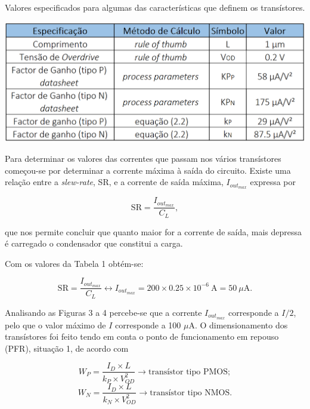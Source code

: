 \documentclass[11pt]{article}
\numberwithin{equation}{section}
\begin{document}
\begin{table}[H]
	\centering
	\caption{Valores especificados para algumas das características que definem os transístores.}
	\vspace{-1.5mm}
	\includegraphics[keepaspectratio=true, scale=0.45]{teoricas/tabela2}
\end{table}

Para determinar os valores das correntes que passam nos vários transístores começou-se por determinar a corrente máxima à saída do circuito. Existe uma relação entre a \textit{slew-rate}, SR, e a corrente de saída máxima, $I_{out_{max}}$ expressa por

\vspace{-3mm}
\begin{equation}
\text{SR} = \frac{I_{out_{max}}}{C_L},
\end{equation}

\vspace{1mm}
que nos permite concluir que quanto maior for a corrente de saída, mais depressa é carregado o condensador que constitui a carga.

Com os valores da Tabela 1 obtém-se:

\vspace{-3mm}
\begin{equation}
\text{SR} = \frac{I_{out_{max}}}{C_L} \leftrightarrow I_{out_{max}} = 200 \times 0.25 \times 10^{-6}~\text{A} = 50~\mu \text{A}.
\end{equation}

\vspace{1mm}
Analisando as Figuras 3 a 4 percebe-se que a corrente $I_{out_{max}}$ corresponde a $I/2$, pelo que o valor máximo de $I$ corresponde a 100 $\mu$A. O dimensionamento dos transístores foi feito tendo em conta o ponto de funcionamento em repouso (PFR), situação 1, de acordo com

\vspace{-3mm}
\begin{equation}
W_P  = \frac{I_{D} \times L}{k_P \times V_{OD}^2} \rightarrow \text{transístor tipo PMOS};
\end{equation}
\vspace{1mm}
\begin{equation}
W_N  = \frac{I_{D} \times L}{k_N \times V_{OD}^2} \rightarrow \text{transístor tipo NMOS}.
\end{equation}
\end{document}
